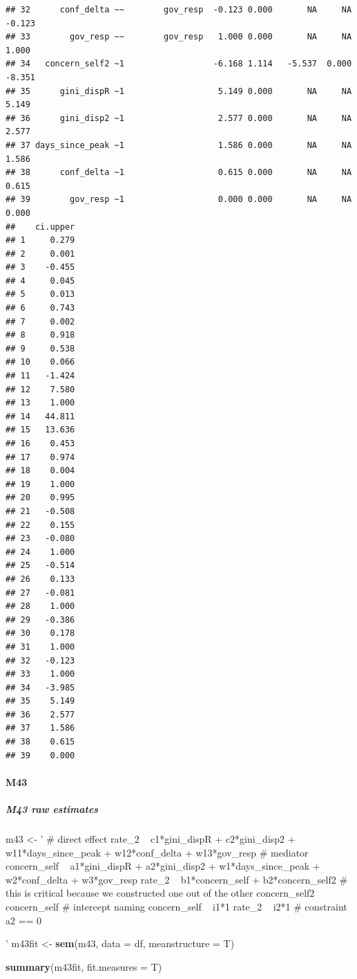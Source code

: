 \documentclass[
]{article}
\newenvironment{Shaded}{\begin{snugshade}}{\end{snugshade}}
\newcommand{\DataTypeTok}[1]{\textcolor[rgb]{0.13,0.29,0.53}{#1}}
\newcommand{\KeywordTok}[1]{\textcolor[rgb]{0.13,0.29,0.53}{\textbf{#1}}}
\newcommand{\NormalTok}[1]{#1}
\newcommand{\StringTok}[1]{\textcolor[rgb]{0.31,0.60,0.02}{#1}}
\begin{document}
\begin{verbatim}
## 32      conf_delta ~~        gov_resp  -0.123 0.000       NA     NA   -0.123
## 33        gov_resp ~~        gov_resp   1.000 0.000       NA     NA    1.000
## 34   concern_self2 ~1                  -6.168 1.114   -5.537  0.000   -8.351
## 35      gini_dispR ~1                   5.149 0.000       NA     NA    5.149
## 36      gini_disp2 ~1                   2.577 0.000       NA     NA    2.577
## 37 days_since_peak ~1                   1.586 0.000       NA     NA    1.586
## 38      conf_delta ~1                   0.615 0.000       NA     NA    0.615
## 39        gov_resp ~1                   0.000 0.000       NA     NA    0.000
##    ci.upper
## 1     0.279
## 2     0.001
## 3    -0.455
## 4     0.045
## 5     0.013
## 6     0.743
## 7     0.002
## 8     0.918
## 9     0.538
## 10    0.066
## 11   -1.424
## 12    7.580
## 13    1.000
## 14   44.811
## 15   13.636
## 16    0.453
## 17    0.974
## 18    0.004
## 19    1.000
## 20    0.995
## 21   -0.508
## 22    0.155
## 23   -0.080
## 24    1.000
## 25   -0.514
## 26    0.133
## 27   -0.081
## 28    1.000
## 29   -0.386
## 30    0.178
## 31    1.000
## 32   -0.123
## 33    1.000
## 34   -3.985
## 35    5.149
## 36    2.577
## 37    1.586
## 38    0.615
## 39    0.000
\end{verbatim}

\hypertarget{m43}{%
\paragraph{M43}\label{m43}}

\hypertarget{m43-raw-estimates}{%
\subparagraph{M43 raw estimates}\label{m43-raw-estimates}}

\begin{Shaded}
\begin{Highlighting}[]
\NormalTok{m43 <-}\StringTok{ '   # direct effect}
\StringTok{             rate_2 ~ c1*gini_dispR + c2*gini_disp2 + w11*days_since_peak + w12*conf_delta + w13*gov_resp }
\StringTok{           # mediator}
\StringTok{             concern_self ~ a1*gini_dispR + a2*gini_disp2 + w1*days_since_peak + w2*conf_delta + w3*gov_resp }
\StringTok{             rate_2 ~ b1*concern_self + b2*concern_self2 }
\StringTok{           # this is critical because we constructed one out of the other   }
\StringTok{             concern_self2 ~ concern_self}
\StringTok{           # intercept naming}
\StringTok{             concern_self ~ i1*1}
\StringTok{             rate_2 ~ i2*1}
\StringTok{           # constraint}
\StringTok{             a2 == 0}

\StringTok{         '}
\NormalTok{m43fit <-}\StringTok{ }\KeywordTok{sem}\NormalTok{(m43, }\DataTypeTok{data =}\NormalTok{ df, }\DataTypeTok{meanstructure =}\NormalTok{ T)}

\KeywordTok{summary}\NormalTok{(m43fit, }\DataTypeTok{fit.measures =}\NormalTok{ T)}
\end{Highlighting}
\end{Shaded}
\end{document}
